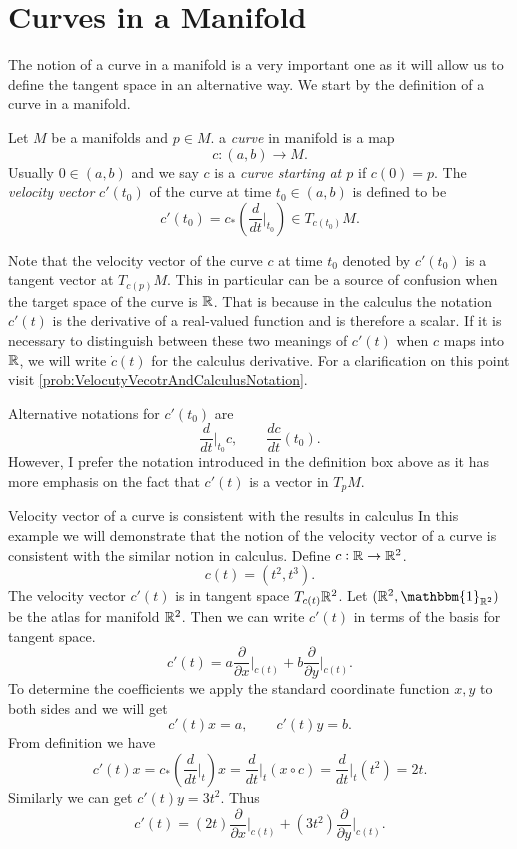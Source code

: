 \section{Curves in a Manifold}
The notion of a curve in a manifold is a very important one as it will allow us to define the tangent space in an alternative way. We start by the definition of a curve in a manifold.

\begin{definition}
	Let $ M $ be a manifolds and $ p \in M $. a \emph{curve} in manifold is a map
	\[ c: (a,b) \to M. \]
	Usually $ 0 \in (a,b) $ and we say $ c $ is a \emph{curve starting at $ p $} if $ c(0) = p $. The \emph{velocity vector} $ c'(t_0) $ of the curve at time $ t_0 \in (a,b) $ is defined to be
	\[ c'(t_0) = c_*(\frac{d}{dt}\big|_{t_0}) \in T_{c(t_0)}M. \]
\end{definition}

\begin{remark}
	Note that the velocity vector of the curve $ c $ at time $ t_0 $ denoted by $ c'(t_0) $ is a tangent vector at $ T_{c(p)}M $. This in particular can be a source of confusion when the target space of the curve is $ \mathbb{R} $. That is because in the calculus the notation $ c'(t) $ is the derivative of a real-valued function and is therefore a scalar. If it is necessary to distinguish between these two meanings of $ c'(t) $ when $ c $ maps into $ \mathbb{R} $, we will write $ \dot{c}(t) $ for the calculus derivative. For a clarification on this point visit \autoref{prob:VelocutyVecotrAndCalculusNotation}.
\end{remark}
\begin{remark}
	Alternative notations for $ c'(t_0) $ are
	\[ \frac{d}{dt}\big|_{t_0} c, \qquad \frac{dc}{dt}(t_0). \]
	However, I prefer the notation introduced in the definition box above as it has more emphasis on the fact that $ c'(t) $ is a vector in $ T_pM $.
\end{remark}

\begin{example}{Velocity vector of a curve is consistent with the results in calculus}
	\label{example:VelocityVectorWorkedExample}
	In this example we will demonstrate that the notion of the velocity vector of a curve is consistent with the similar notion in calculus. Define $ c:\mathbb{R} \to \mathbb{R}^2 $. 
	\[ c(t)  = (t^2, t^3). \]
	The velocity vector $ c'(t) $ is in tangent space $ T_{c(t)}\mathbb{R}^2 $. Let $ (\R^2, \mathbbm{1}_{\R^2}) $ be the atlas for manifold $ \mathbb{R}^2 $. Then we can write $ c'(t)$ in terms of the basis for tangent space.
	\[ c'(t) = a \frac{\partial}{\partial  x}\big|_{c(t)} + b \frac{\partial}{\partial  y}\big|_{c(t)}. \] 
	To determine the coefficients we apply the standard coordinate function $ x,y $ to both sides and we will get
	\[ c'(t)x = a, \qquad c'(t)y = b. \]
	From definition we have
	\[ c'(t) x = c_*(\frac{d}{dt}\big|_t) x = \frac{d}{dt}\big|_t (x\circ c) = \frac{d}{dt}\big|_t (t^2) = 2t.   \]
	Similarly we can get $ c'(t) y = 3t^2$. Thus
	\[ c'(t) = (2t) \frac{\partial}{\partial  x}\big|_{c(t)} + (3t^2) \frac{\partial}{\partial  y}\big|_{c(t)}. \]
\end{example}

